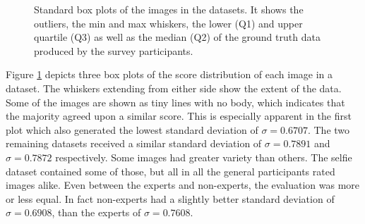 \newpage

\begin{figure}[h]
\centering
        \quad
        \quad
    \caption{Standard box plots of the images in the datasets. It shows the outliers, the min and max whiskers, the lower (Q1) and upper quartile (Q3) as well as the median (Q2) of the ground truth data produced by the survey participants.}
    \label{fig:boxplot}
\end{figure}

Figure \ref{fig:boxplot} depicts three box plots of the score distribution of each image in a dataset. The whiskers extending from either side show the extent of the data. Some of the images are shown as tiny lines with no body, which indicates that the majority agreed upon a similar score. This is especially apparent in the first plot which also generated the lowest standard deviation of $\sigma = 0.6707$. The two remaining datasets received a similar standard deviation of $\sigma = 0.7891$ and $\sigma = 0.7872$ respectively. Some images had greater variety than others. The selfie dataset contained some of those, but all in all the general participants rated images alike. Even between the experts and non-experts, the evaluation was more or less equal. In fact non-experts had a slightly better standard deviation of $\sigma = 0.6908$, than the experts of $\sigma = 0.7608$. 


